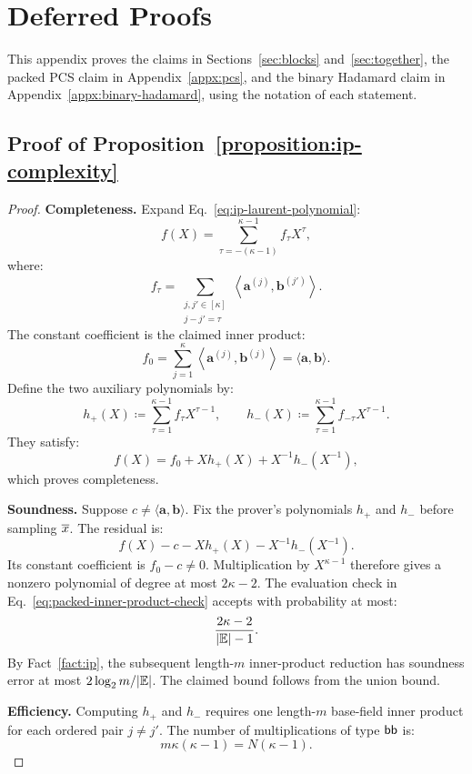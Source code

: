 \section{Deferred Proofs}
\label{appx:proof}
\label{appx:auxiliary-proofs}

This appendix proves the claims in Sections~\ref{sec:blocks}
and~\ref{sec:together}, the packed PCS claim in
Appendix~\ref{appx:pcs}, and the binary Hadamard claim in
Appendix~\ref{appx:binary-hadamard}, using the notation of each statement.

\subsection{Proof of Proposition~\ref{proposition:ip-complexity}}
\label{appx:proof-ip}

\begin{proof}
\noindent\textbf{Completeness.}
Expand Eq.~\eqref{eq:ip-laurent-polynomial}:
\[
    f(X)
    =
    \sum_{\tau=-(\kappa-1)}^{\kappa-1}
    f_\tau X^\tau,
\]
where:
\[
    f_\tau
    =
    \sum_{\substack{j,j'\in[\kappa]\\j-j'=\tau}}
    \left\langle
        \bm a^{(j)},\bm b^{(j')}
    \right\rangle.
\]
The constant coefficient is the claimed inner product:
\[
    f_0
    =
    \sum_{j=1}^{\kappa}
    \left\langle
        \bm a^{(j)},\bm b^{(j)}
    \right\rangle
    =
    \langle\bm a,\bm b\rangle.
\]
Define the two auxiliary polynomials by:
\[
    h_+(X)
    \coloneqq
    \sum_{\tau=1}^{\kappa-1}
    f_\tau X^{\tau-1},
    \qquad
    h_-(X)
    \coloneqq
    \sum_{\tau=1}^{\kappa-1}
    f_{-\tau}X^{\tau-1}.
\]
They satisfy:
\[
    f(X)
    =
    f_0
    +Xh_+(X)
    +X^{-1}h_-(X^{-1}),
\]
which proves completeness.

\smallskip\noindent\textbf{Soundness.}
Suppose \(c\neq\langle\bm a,\bm b\rangle\). Fix the prover's
polynomials \(h_+\) and \(h_-\) before sampling \(\overline{x}\).
The residual is:
\[
    f(X)-c-Xh_+(X)-X^{-1}h_-(X^{-1}).
\]
Its constant coefficient is \(f_0-c\neq0\). Multiplication by
\(X^{\kappa-1}\) therefore gives a nonzero polynomial of degree
at most \(2\kappa-2\). The evaluation check in
Eq.~\eqref{eq:packed-inner-product-check} accepts with probability
at most:
\[
    \frac{2\kappa-2}{|\mathbb{E}|-1}.
\]
By Fact~\ref{fact:ip}, the subsequent length-\(m\)
inner-product reduction has soundness error at most
\(2\log_2m/|\mathbb{E}|\). The claimed bound follows from
the union bound.

\smallskip\noindent\textbf{Efficiency.}
Computing \(h_+\) and \(h_-\) requires one length-\(m\)
base-field inner product for each ordered pair \(j\neq j'\).
The number of multiplications of type \(\mathsf{bb}\) is:
\[
    m\kappa(\kappa-1)
    =
    N(\kappa-1).
\]


\end{proof}
